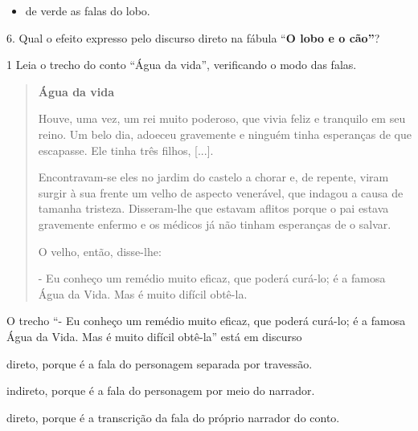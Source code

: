 \begin{escolha}
\begin{escolha}
{\begin{escolha}
\begin{itemize}
\item de verde as falas do lobo.
\end{itemize}


6. Qual o efeito expresso pelo discurso direto na fábula ``\textbf{O
lobo e o cão''}?



\num{1} Leia o trecho do conto ``Água da vida'', verificando o modo das falas.


\begin{quote}
\textbf{Água da vida}

Houve, uma vez, um rei muito poderoso, que vivia feliz e tranquilo em
seu reino. Um belo dia, adoeceu gravemente e ninguém tinha esperanças de
que escapasse. Ele tinha três filhos, {[}...{]}.

Encontravam-se eles no jardim do castelo a chorar e, de repente, viram
surgir à sua frente um velho de aspecto venerável, que indagou a causa
de tamanha tristeza. Disseram-lhe que estavam aflitos porque o pai
estava gravemente enfermo e os médicos já não tinham esperanças de o
salvar.

O velho, então, disse-lhe:

- Eu conheço um remédio muito eficaz, que poderá curá-lo; é a famosa
Água da Vida. Mas é muito difícil obtê-la.
\end{quote}


O trecho ``- Eu conheço um remédio muito eficaz, que poderá curá-lo; é a
famosa Água da Vida. Mas é muito difícil obtê-la'' está em discurso

\begin{escolha}
\item direto, porque é a fala do personagem separada por travessão.

\item indireto, porque é a fala do personagem por meio do narrador.

\item direto, porque é a transcrição da fala do próprio narrador do conto.


\end{escolha}
\end{escolha}}
\end{escolha}
\end{escolha}

